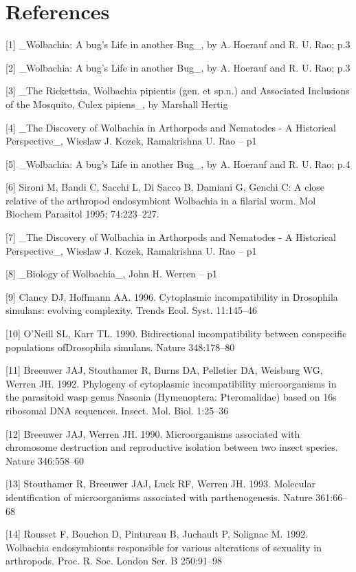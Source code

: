 \documentclass[twocolumn]{article}
\begin{document}
\section*{References}
[1] \_Wolbachia: A bug's Life in another Bug\_, by A. Hoerauf and R. U. Rao;  p.3 

[2] \_Wolbachia: A bug's Life in another Bug\_, by A. Hoerauf and R. U. Rao;  p.3

[3] \_The Rickettsia, Wolbachia pipientis (gen. et sp.n.) and Associated Inclusions of the Mosquito, Culex pipiens\_, by Marshall Hertig

[4] \_The Discovery of Wolbachia in Arthorpods and Nematodes - A Historical Perspective\_, Wieslaw J. Kozek, Ramakrishna U. Rao  -- p1

[5] \_Wolbachia: A bug's Life in another Bug\_, by A. Hoerauf and R. U. Rao;  p.4

[6] Sironi M, Bandi C, Sacchi L, Di Sacco B, Damiani G, Genchi C: A close relative of the arthropod endosymbiont Wolbachia in a filarial worm. Mol Biochem Parasitol 1995; 74:223–227.

[7] \_The Discovery of Wolbachia in Arthorpods and Nematodes - A Historical Perspective\_, Wieslaw J. Kozek, Ramakrishna U. Rao  -- p1

[8] \_Biology of Wolbachia\_, John H. Werren  -- p1

[9] Clancy DJ, Hoffmann AA. 1996. Cytoplasmic incompatibility in Drosophila simulans: evolving complexity. Trends Ecol. Syst. 11:145–46

[10] O’Neill SL, Karr TL. 1990. Bidirectional incompatibility between conspecific populations ofDrosophila simulans. Nature 348:178–80

[11] Breeuwer JAJ, Stouthamer R, Burns DA, Pelletier DA, Weisburg WG, Werren JH. 1992. Phylogeny of cytoplasmic incompatibility microorganisms in the parasitoid wasp genus Nasonia (Hymenoptera: Pteromalidae) based on 16s ribosomal DNA sequences. Insect. Mol. Biol. 1:25–36

[12] Breeuwer JAJ, Werren JH. 1990. Microorganisms associated with chromosome destruction and reproductive isolation between two insect species. Nature 346:558–60

[13] Stouthamer R, Breeuwer JAJ, Luck RF, Werren JH. 1993. Molecular identification of microorganisms associated with parthenogenesis. Nature 361:66–68 

[14] Rousset F, Bouchon D, Pintureau B, Juchault P, Solignac M. 1992. Wolbachia endosymbionts responsible for various alterations of sexuality in arthropods. Proc. R. Soc. London Ser. B 250:91–98
\end{document}

